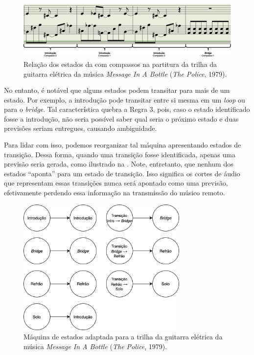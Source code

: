 \begin{figure}[htbp]
    \centering
    \includegraphics[width=1\textwidth]{images/dtw-real division.png}
    \caption{Relação dos estados da  com compassos na partitura da trilha da guitarra elétrica da música \textit{Message In A Bottle} (\textit{The Police}, 1979).}
    \label{fig:miab_sheet_music}
\end{figure}

No entanto, é notável que alguns estados podem transitar para mais de um estado. Por exemplo, a introdução pode transitar entre si mesma em um \textit{loop} ou para o \textit{bridge}. Tal característica quebra a Regra 3, pois, caso o estado identificado fosse a introdução, não seria possível saber qual seria o próximo estado e duas previsões seriam entregues, causando ambiguidade.

Para lidar com isso, podemos reorganizar tal máquina apresentando estados de transição. Dessa forma, quando uma transição fosse identificada, apenas uma previsão seria gerada, como ilustrado na . Note, entretanto, que nenhum dos estados ``aponta'' para um estado de transição. Isso significa os cortes de áudio que representam essas transições nunca será apontado como uma previsão, efetivamente perdendo essa informação na transmissão do músico remoto.

\begin{figure}[htbp]
    \centering
    \includegraphics[width=0.75\textwidth]{images/MIAB adapted state machine.png}
    \caption{Máquina de estados adaptada para a trilha da guitarra elétrica da música \textit{Message In A Bottle} (\textit{The Police}, 1979).}
    \label{fig:miab_adapted_state_machine}
\end{figure}

